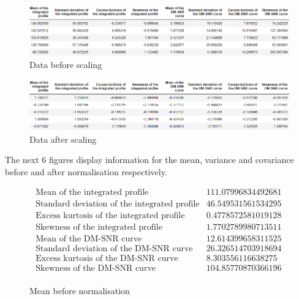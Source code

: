 \documentclass[a4paper,12pt]{article}
\begin{document}
    \begin{figure}[ht]
        \centering
        \includegraphics[width=\textwidth]{df-before-scaling}
        \caption{Data before scaling}
    \end{figure}

    \begin{figure}[ht]
        \centering
        \includegraphics[width=\textwidth]{df-after-scaling}
        \caption{Data after scaling}
    \end{figure}

    The next 6 figures display information for the mean, variance and covariance before and after normalisation respectively.

    \newpage

    \begin{figure}[ht!]
        \begin{math}
            \begin{array}{lcr}
                \mbox{ Mean of the integrated profile} & 111.07996834492681 \\
                \mbox{ Standard deviation of the integrated profile} & 46.549531561534295 \\
                \mbox{ Excess kurtosis of the integrated profile} & 0.4778572581019128 \\
                \mbox{ Skewness of the integrated profile} & 1.7702789980713511 \\
                \mbox{ Mean of the DM-SNR curve} & 12.614399658311525 \\
                \mbox{ Standard deviation of the DM-SNR curve} & 26.326514703918694 \\
                \mbox{ Excess kurtosis of the DM-SNR curve} & 8.303556116638275 \\
                \mbox{ Skewness of the DM-SNR curve} & 104.85770870366196 \\
            \end{array}
        \end{math}
        \caption{Mean before normalisation}
    \end{figure}
\end{document}
